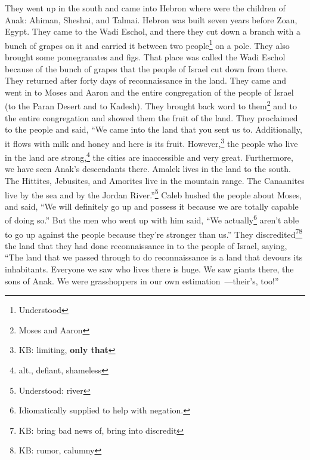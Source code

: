 \begin{inparaenum}
     They went up in the south and came into Hebron where were the children of Anak: Ahiman, Sheshai, and Talmai. Hebron was built seven years before Zoan, Egypt.%
     They came to the Wadi Eschol, and there they cut down a branch with a bunch of grapes on it and carried it between two people\footnote{Understood} on a pole. They also brought some pomegranates and figs.%
     That place was called the Wadi Eschol because of the bunch of grapes that the people of Israel cut down from there.%
     They returned after forty days of reconnaissance in the land.%
     They came and went in to Moses and Aaron and the entire congregation of the people of Israel (to the Paran Desert and to Kadesh). They brought back word to them\footnote{Moses and Aaron} and to the entire congregation and showed them the fruit of the land.%
     They proclaimed to the people and said, ``We came into the land that you sent us to. Additionally, it flows with milk and honey and here is its fruit.%
     However,\footnote{KB: limiting, \textbf{only that}} the people who live in the land are strong,\footnote{alt., defiant, shameless} the cities are inaccessible and very great. Furthermore, we have seen Anak's descendants there.%
     Amalek lives in the land to the south. The Hittites, Jebusites, and Amorites live in the mountain range. The Canaanites live by the sea and by the Jordan River.''\footnote{Understood: river}%
     Caleb hushed the people about Moses, and said, ``We will definitely go up and possess it because we are totally capable of doing so.''%
     But the men who went up with him said, ``We actually\footnote{Idiomatically supplied to help with negation.} aren't able to go up against the people because they're stronger than us.''%
     They discredited\footnote{KB: bring bad news of, bring into discredit}\footnote{KB: rumor, calumny} the land that they had done reconnaissance in to the people of Israel, saying, ``The land that we passed through to do reconnaissance is a land that devours its inhabitants. Everyone we saw who lives there is huge.%
     We saw giants there, the sons of Anak. We were grasshoppers in our own estimation~---their's, too!''%
\end{inparaenum}
